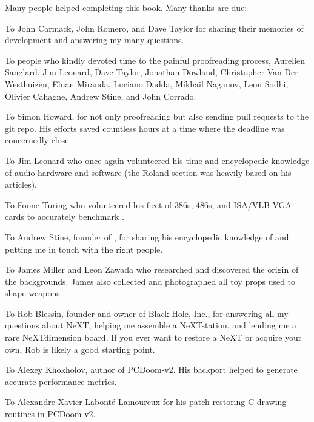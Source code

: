 Many people helped completing this book. Many thanks are due:\\
\par
To John Carmack, John Romero, and Dave Taylor for sharing their memories of \doom{} development and answering my many questions.\\
\par
To people who kindly devoted time to the painful proofreading process, Aurelien Sanglard, Jim Leonard, Dave Taylor, Jonathan Dowland, Christopher Van Der Westhuizen, Eluan Miranda, Luciano Dadda, Mikhail Naganov, Leon Sodhi, Olivier Cahagne, Andrew Stine, and John Corrado.\\
\par
To Simon Howard, for not only proofreading but also sending pull requests to the git repo. His efforts saved countless hours at a time where the deadline was
concernedly close.\\
\par
To Jim Leonard who once again volunteered his time and encyclopedic knowledge of audio hardware and software (the Roland section was heavily based on his articles).\\
\par
To Foone Turing who volunteered his fleet of 386s, 486s, and ISA/VLB VGA cards to accurately benchmark \doom{}.\\
\par
To Andrew Stine, founder of , for sharing his encyclopedic knowledge of \doom{} and putting me in touch with the right people.\\
\par
To James Miller and Leon Zawada who researched and discovered the origin of the backgrounds. James also collected and photographed all toy props used to shape \doom{} weapons.\\
\par
To Rob Blessin, founder and owner of Black Hole, Inc., for answering all my questions about NeXT, helping me assemble a NeXTstation, and lending me a rare NeXTdimension board. If you ever want to restore a NeXT or acquire your own, Rob is likely a good starting point.\\
\par
To Alexey Khokholov, author of PCDoom-v2. His backport helped to generate accurate performance metrics.\\
\par
To Alexandre-Xavier Labont\'e-Lamoureux for his patch restoring C drawing routines in PCDoom-v2.\\
